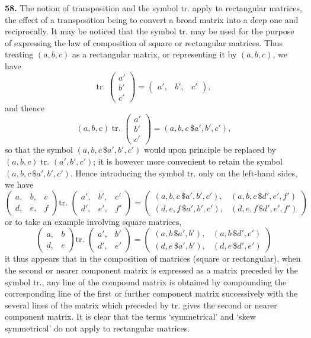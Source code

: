 \documentclass[12pt,a4paper]{article}
\theoremstyle{definition}
\begin{document}
\medskip
\noindent\textbf{58.} The notion of transposition and the symbol $\text{tr.}$ apply to rectangular matrices, the effect of a transposition being to convert a broad matrix into a deep one and reciprocally. It may be noticed that the symbol $\text{tr.}$ may be used for the purpose of expressing the law of composition of square or rectangular matrices. Thus treating $(a,b,c)$ as a rectangular matrix, or representing it by $(a,b,c)$, we have
\[\text{tr. }\begin{pmatrix} a' \\ b' \\ c' \end{pmatrix} = \begin{pmatrix} a', & b', & c' \end{pmatrix},\]
and thence
\[
(a,b,c)\;\text{tr. }\begin{pmatrix} a' \\ b' \\ c' \end{pmatrix}
= (a,b,c\,\$a',b',c'),
\]
so that the symbol $(a,b,c\,\$a',b',c')$ would upon principle be replaced by $(a,b,c)\;\text{tr. }(a',b',c')$; it is however more convenient to retain the symbol $(a,b,c\,\$a',b',c')$. Hence introducing the symbol $\text{tr.}$ only on the left-hand sides, we have
\[
\begin{pmatrix} a, & b, & c \\ d, & e, & f \end{pmatrix}
\text{tr. }\begin{pmatrix} a', & b', & c' \\ d', & e', & f' \end{pmatrix}
=
\begin{pmatrix}
(a,b,c\,\$a',b',c'), & (a,b,c\,\$d',e',f') \\
(d,e,f\,\$a',b',c'), & (d,e,f\,\$d',e',f')
\end{pmatrix}
\]
or to take an example involving square matrices,
\[
\begin{pmatrix} a, & b \\ d, & e \end{pmatrix}
\text{tr. }\begin{pmatrix} a', & b' \\ d', & e' \end{pmatrix}
=
\begin{pmatrix}
(a,b\,\$a',b'), & (a,b\,\$d',e') \\
(d,e\,\$a',b'), & (d,e\,\$d',e')
\end{pmatrix}
\]
it thus appears that in the composition of matrices (square or rectangular), when the second or nearer component matrix is expressed as a matrix preceded by the symbol $\text{tr.}$, any line of the compound matrix is obtained by compounding the corresponding line of the first or further component matrix successively with the several lines of the matrix which preceded by $\text{tr.}$ gives the second or nearer component matrix. It is clear that the terms `symmetrical' and `skew symmetrical' do not apply to rectangular matrices.
\end{document}
